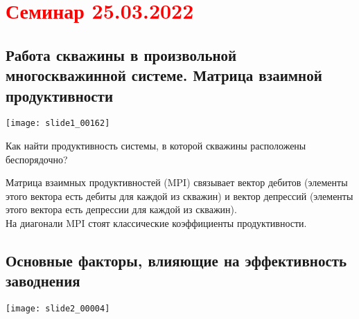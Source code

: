 \documentclass[main.tex]{subfiles}
\begin{document}
\section{\textcolor{red}{Семинар 25.03.2022}}

\subsection{Работа скважины в произвольной многоскважинной системе. Матрица взаимной продуктивности}

\texttt{[image: slide1\_00162]}

Как найти продуктивность системы, в которой скважины расположены беспорядочно?


Матрица взаимных продуктивностей (MPI) связывает вектор дебитов (элементы этого вектора есть дебиты для каждой из скважин) и вектор депрессий (элементы этого вектора есть депрессии для каждой из скважин).\\

На диагонали MPI стоят классические коэффициенты продуктивности.













\subsection{Основные факторы, влияющие на эффективность заводнения}

\texttt{[image: slide2\_00004]}


\end{document}
